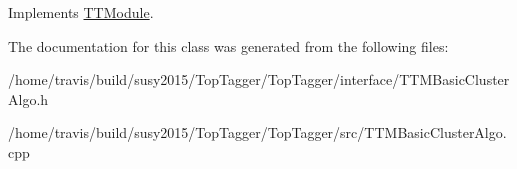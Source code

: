 Implements \hyperlink{classTTModule_a14e7c03fbf4ee1a5008c9344adc7c896}{T\-T\-Module}.



The documentation for this class was generated from the following files\-:\begin{DoxyCompactItemize}
\item 
/home/travis/build/susy2015/\-Top\-Tagger/\-Top\-Tagger/interface/T\-T\-M\-Basic\-Cluster\-Algo.\-h\item 
/home/travis/build/susy2015/\-Top\-Tagger/\-Top\-Tagger/src/T\-T\-M\-Basic\-Cluster\-Algo.\-cpp\end{DoxyCompactItemize}
